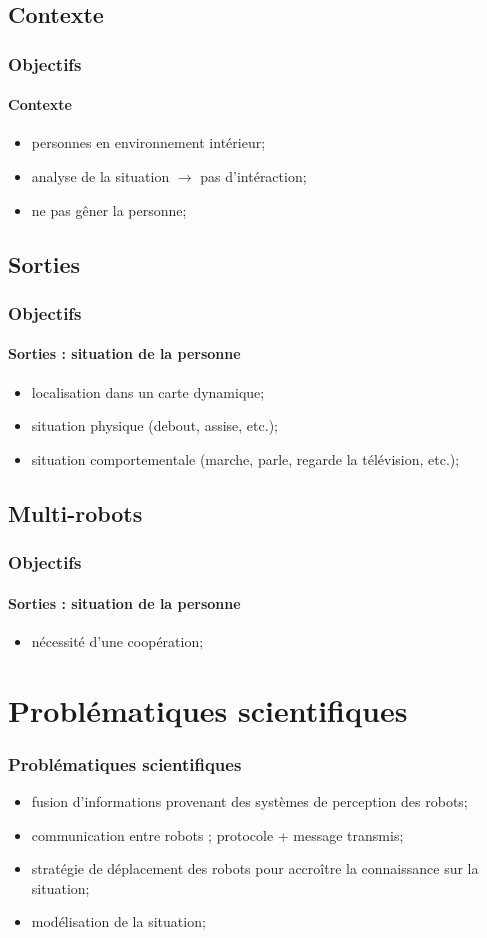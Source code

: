 \documentclass[usepdftitle=false, xcolor=dvipsnames, 12, c]{beamer}
\begin{document}
\subsection{Contexte}
\begin{frame}[label=objContexte]
  \frametitle{Objectifs}
  \framesubtitle{Contexte}
  \begin{itemize}
    \item personnes en environnement intérieur;
    \item analyse de la situation $\rightarrow$ pas d'intéraction;
    \item ne pas gêner la personne;
  \end{itemize}
\end{frame}

\subsection{Sorties}
\begin{frame}[label=objSorties]
  \frametitle{Objectifs}
  \framesubtitle{Sorties : situation de la personne}
    \begin{itemize}
      \item localisation dans un carte dynamique;
      \item situation physique (debout, assise, etc.);
      \item situation comportementale (marche, parle, regarde la télévision, etc.);
    \end{itemize}
\end{frame}

\subsection{Multi-robots}
\begin{frame}[label=objMultirobots]
  \frametitle{Objectifs}
  \framesubtitle{Sorties : situation de la personne}
    \begin{itemize}
      \item nécessité d'une coopération;
    \end{itemize}
\end{frame}

% 
 \section{Problématiques scientifiques}
\begin{frame}
  \frametitle{Problématiques scientifiques}
  \begin{itemize}
    \item fusion d'informations provenant des systèmes de perception des robots;
    \item communication entre robots ; protocole + message transmis;
    \item stratégie de déplacement des robots pour accroître la connaissance sur la situation;
    \item modélisation de la situation;
   \end{itemize}
\end{frame}
\end{document}
